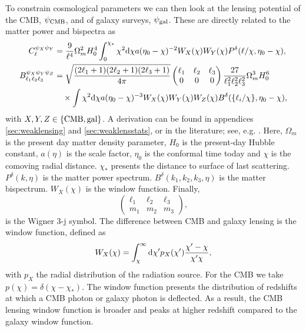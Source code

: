 \documentclass[11pt]{article} %
\DeclareRobustCommand{\d}{\ifmmode\text{d}\else d\fi}
\DeclareRobustCommand{\CMB}{\ifmmode\text{CMB}\else d\fi}
\DeclareRobustCommand{\gal}{\ifmmode\text{gal}\else d\fi}
\begin{document}
To constrain cosmological parameters we can then look at the lensing potential of the CMB, $\psi_\CMB$, and of galaxy surveys, $\psi_\gal$. These are directly related to the matter power and bispectra as
\begin{align}%
    C^{\psi_X\psi_Y}_\ell
    & = \frac{9}{\ell^4}\Omega_m^2H_0^4\int_0^{\chi_*} \chi^2 \d\chi a(\eta_0-\chi)^{-2}W_X(\chi)W_Y(\chi)P^\delta(\ell/\chi,\eta_0-\chi), \label{eq:lensingpower spectrum}\\
    B^{\psi_X\psi_Y\psi_Z}_{\ell_1\ell_2\ell_3} &= \sqrt{\frac{(2\ell_1 + 1)(2\ell_2 + 1)(2\ell_3 + 1)}{4\pi}} \begin{pmatrix} \ell_1 & \ell_2 & \ell_3 \\ 0 & 0 & 0 \end{pmatrix} \frac{27}{\ell_1^2\ell_2^2\ell_3^2}\Omega_m^3H_0^6 \notag\\
    & \quad \times \int \chi^2\d \chi a(\eta_0-\chi)^{-3}W_X(\chi)W_Y(\chi)W_Z(\chi)  B^\delta(\{\ell_i/\chi\}, \eta_0-\chi), \label{eq:lensingbispectrum}
\end{align}
with $X, Y, Z \in \{\CMB, \gal\}$. A derivation can be found in appendices \ref{sec:weaklensing} and \ref{sec:weaklensstats}, or in the literature; see, e.g. \cite{Bartelmann2001}. Here, $\Omega_m$ is the present day matter density parameter, $H_0$ is the present-day Hubble constant, $a(\eta)$ is the scale factor, $\eta_0$ is the conformal time today and $\chi$ is the comoving radial distance. $\chi_*$ presents the distance to surface of last scattering. $P^\delta(k, \eta)$ is the matter power spectrum. $B^\delta(k_1, k_2, k_3, \eta)$ is the matter bispectrum. $W_X(\chi)$ is the window function. Finally,
$$
\begin{pmatrix}
    \ell_1&\ell_2&\ell_3 \\ m_1 & m_2 & m_3
\end{pmatrix},
$$ 
is the Wigner 3-j symbol. The difference between CMB and galaxy lensing is the window function, defined as
\begin{equation}
    W_X(\chi) = \int_\chi^{\infty}\d\chi' p_X(\chi')\frac{\chi'-\chi}{\chi'\chi},
    \label{eq:windowfuncdef}
\end{equation}
with $p_X$ the radial distribution of the radiation source. For the CMB we take $p(\chi) = \delta(\chi - \chi_*)$. The window function presents the distribution of redshifts at which a CMB photon or galaxy photon is deflected. As a result, the CMB lensing window function is broader and peaks at higher redshift compared to the galaxy window function.
\end{document}
